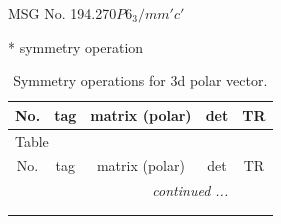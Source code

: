 \documentclass[fleqn,8pt]{jsarticle}
\begin{document}
\setcounter{MaxMatrixCols}{32}

\renewcommand{\tablename}{Table~}
\renewcommand{\figurename}{Figure~}
\begin{center}
\LARGE
MSG No. 194.270\quad$P6_{3}/mm'c'$
\end{center}
* symmetry operation
\renewcommand{\arraystretch}{1.3}
\begin{longtable}{ccccc}
\caption{Symmetry operations for 3d polar vector.}
 \\
 \hline \hline
No. & tag & matrix (polar) & det & TR \\ \hline \endfirsthead

\multicolumn{4}{l}{\tablename\ \thetable{}} \\
 \hline \hline
No. & tag & matrix (polar) & det & TR \\ \hline \endhead

 \hline \hline
\multicolumn{4}{r}{\footnotesize\it continued ...} \\ \endfoot

 \hline \hline
\multicolumn{4}{r}{} \\ \endlastfoot


\end{longtable}
\end{document}
